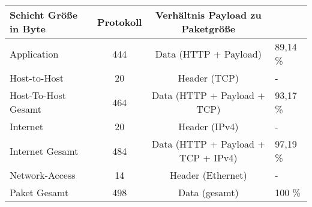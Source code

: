 \begin{longtable}{l|c|c|l}
    \\\hline
    Schicht
    Größe in Byte & Protokoll & Verhältnis Payload zu Paketgröße
    \\\hline
    Application & 444 & Data (HTTP + Payload) & 89,14 \%
    \\\hline
    Host-to-Host & 20 & Header (TCP) & -
    \\\hline
    Host-To-Host Gesamt & 464 & Data (HTTP + Payload + TCP) & 93,17 \%
    \\\hline
    Internet & 20 & Header (IPv4) & -
    \\\hline
    Internet Gesamt & 484 & Data (HTTP + Payload + TCP + IPv4) & 97,19 \%
    \\\hline
    Network-Access & 14 & Header (Ethernet) & -
    \\\hline
    Paket Gesamt & 498 & Data (gesamt) & 100 \%
\end{longtable}